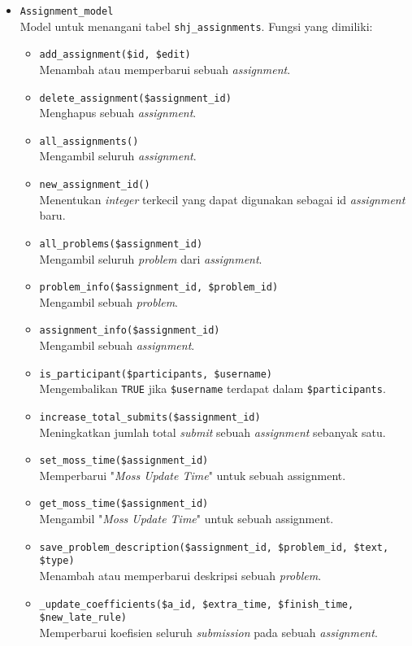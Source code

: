\begin{itemize}
	\item \verb|Assignment_model| \\ Model untuk menangani tabel \verb|shj_assignments|. Fungsi yang dimiliki:
	\begin{itemize}
		\item \verb|add_assignment($id, $edit)|\\ Menambah atau memperbarui sebuah \textit{assignment}.
		\item \verb|delete_assignment($assignment_id)| \\ Menghapus sebuah \textit{assignment}.
		\item \verb|all_assignments()| \\ Mengambil seluruh \textit{assignment}.
		\item \verb|new_assignment_id()| \\ Menentukan \textit{integer} terkecil yang dapat digunakan sebagai id \textit{assignment} baru.
		\item \verb|all_problems($assignment_id)| \\ Mengambil seluruh \textit{problem} dari \textit{assignment}.
		\item \verb|problem_info($assignment_id, $problem_id)| \\ Mengambil sebuah \textit{problem}.
		\item \verb|assignment_info($assignment_id)| \\ Mengambil sebuah \textit{assignment}.
		\item \verb|is_participant($participants, $username)| \\ Mengembalikan \verb|TRUE| jika \verb|$username| terdapat dalam \verb|$participants|.
		\item \verb|increase_total_submits($assignment_id)| \\ Meningkatkan jumlah total \textit{submit} sebuah \textit{assignment} sebanyak satu.
		\item \verb|set_moss_time($assignment_id)| \\ Memperbarui "\textit{Moss Update Time}" untuk sebuah assignment.
		\item \verb|get_moss_time($assignment_id)| \\ Mengambil "\textit{Moss Update Time}" untuk sebuah assignment.
		\item \verb|save_problem_description($assignment_id, $problem_id, $text, $type)| \\ Menambah atau memperbarui deskripsi sebuah \textit{problem}.
		\item \verb|_update_coefficients($a_id, $extra_time, $finish_time, $new_late_rule)| \\ Memperbarui koefisien seluruh \textit{submission} pada sebuah \textit{assignment}.
	\end{itemize}
	

\end{itemize}
